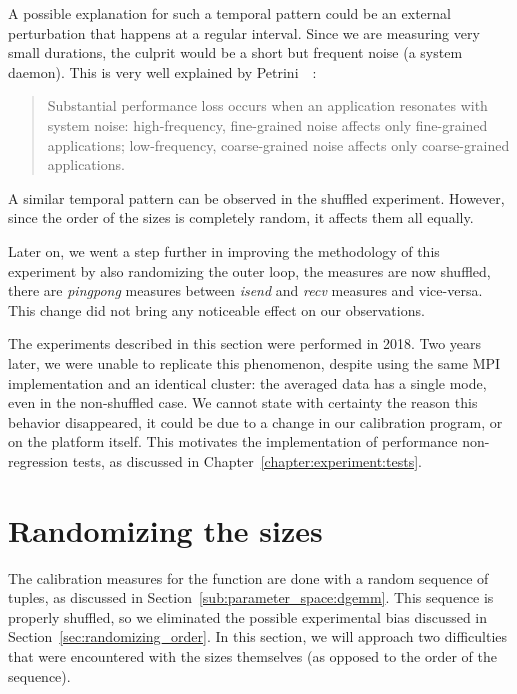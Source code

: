         A possible explanation for such a temporal pattern could be an external perturbation that happens at a regular
        interval. Since we are measuring very small durations, the culprit would be a short but frequent noise (\eg a
        system daemon). This is very well explained by Petrini~\etal~\cite{Petrini_2003}:
        \begin{quote}
            Substantial performance loss occurs when an application resonates with system noise: high-frequency,
            fine-grained noise affects only fine-grained applications; low-frequency, coarse-grained noise affects only
            coarse-grained applications.
        \end{quote}

        A similar temporal pattern can be observed in the shuffled experiment. However, since the order of the sizes is
        completely random, it affects them all equally.

        Later on, we went a step further in improving the methodology of this experiment by also randomizing the outer
        loop, \ie the measures are now shuffled, there are \emph{pingpong} measures between \emph{isend} and \emph{recv}
        measures and vice-versa. This change did not bring any noticeable effect on our observations.

        The experiments described in this section were performed in 2018. Two years later, we were unable to replicate
        this phenomenon, despite using the same MPI implementation and an identical cluster: the averaged data has a
        single mode, even in the non-shuffled case. We cannot state with certainty the reason this behavior disappeared,
        it could be due to a change in our calibration program, or on the platform itself. This motivates the
        implementation of performance non-regression tests, as discussed in Chapter~\ref{chapter:experiment:tests}.

    \section{Randomizing the sizes}%
    \label{sec:randomizing_sizes}
        The calibration measures for the \dgemm function are done with a random sequence of tuples, as discussed in
        Section~\ref{sub:parameter_space:dgemm}. This sequence is properly shuffled, so we eliminated the possible
        experimental bias discussed in Section~\ref{sec:randomizing_order}. In this section, we will approach two
        difficulties that were encountered with the sizes themselves (as opposed to the order of the sequence).

